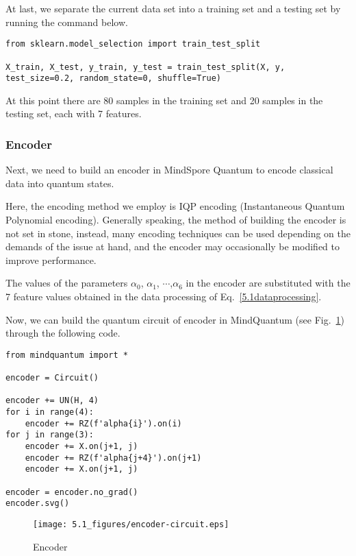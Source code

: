 At last, we separate the current data set into a training set and a testing set by running the command below.

\begin{lstlisting}
from sklearn.model_selection import train_test_split

X_train, X_test, y_train, y_test = train_test_split(X, y, test_size=0.2, random_state=0, shuffle=True)
\end{lstlisting}

At this point there are 80 samples in the training set and 20 samples in the testing set, each with 7 features.

\subsubsection{Encoder}
Next, we need to build an encoder in MindSpore Quantum to encode classical data into quantum states.

Here, the encoding method we employ is IQP encoding (Instantaneous Quantum Polynomial encoding). Generally speaking, the method of building the encoder is not set in stone, instead, many encoding techniques can be used depending on the demands of the issue at hand, and the encoder may occasionally be modified to improve performance.

The values of the parameters $\alpha_0$, $\alpha_1$, $\cdots$,$\alpha_6$ in the encoder are substituted with the 7 feature values obtained in the data processing of Eq.~\eqref{5.1dataprocessing}.

Now, we can build the quantum circuit of encoder in MindQuantum (see Fig.~\ref{5.1encoder-circuit}) through the following code.

\begin{lstlisting}
from mindquantum import *

encoder = Circuit()

encoder += UN(H, 4)
for i in range(4):
    encoder += RZ(f'alpha{i}').on(i)
for j in range(3):
    encoder += X.on(j+1, j)
    encoder += RZ(f'alpha{j+4}').on(j+1)
    encoder += X.on(j+1, j)

encoder = encoder.no_grad()
encoder.svg()
\end{lstlisting}

\begin{figure}[H]
    \centering
    \texttt{[image: 5.1\_figures/encoder-circuit.eps]}
    \caption{Encoder}
    \label{5.1encoder-circuit}
\end{figure}


